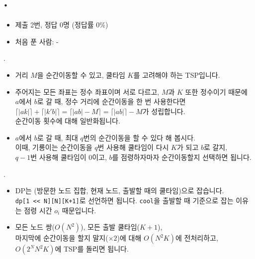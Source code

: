 
\section{\texorpdfstring{\pletter. \ptitle}{문제 \pletter}}

\begin{frame}[label=problem-L]
    \sectiontitle{\pletter}{\ptitle}
    \begin{itemize}
        \item 제출 2번, 정답 0명 (정답률 0\%)
        \item 처음 푼 사람: -
    \end{itemize}
\end{frame}

\begin{frame}{\textbf{\pletter}. \ptitle}

    \begin{itemize}
        \item 거리 $M$을 순간이동할 수 있고, 쿨타임 $K$를 고려해야 하는 TSP입니다.
        \item 주어지는 모든 좌표는 정수 좌표이며 서로 다르고, $M$과 $K$ 또한 정수이기 때문에 \\
        $a$에서 $b$로 갈 때, 정수 거리에 순간이동을 한 번 사용한다면 \\
        $\lceil |ak| \rceil + \lceil |k'b| \rceil = \lceil |ab| - M \rceil = \lceil |ab| \rceil - M$가 성립합니다. \\
        순간이동 횟수에 대해 일반화됩니다.

        \item $a$에서 $b$로 갈 때, 최대 $q$번의 순간이동을 할 수 있다 해 봅시다. \\
        이때, 기룡이는 순간이동을 $q$번 사용해 쿨타임이 다시 $K$가 되고 $b$로 갈지,\\ 
        $q-1$번 사용해 쿨타임이 $0$이고, $b$를 점령하자마자 순간이동할지 선택하면 됩니다. 
    \end{itemize}
\end{frame}
\begin{frame}{\textbf{\pletter}. \ptitle}

    \begin{itemize}
        \item DP는 (방문한 노드 집합, 현재 노드, 출발할 때의 쿨타임)으로 잡습니다.\\
        \texttt{dp[1 <{}< N][N][K+1]}로 선언하면 됩니다. \texttt{cool}을 출발할 때 기준으로 잡는 이유는 점령 시간 $o_i$ 때문입니다.

        \item 모든 노드 쌍($O(N^2)$), 모든 출발 쿨타임($K+1$), \\
        마지막에 순간이동을 할지 말지($\times 2$)에 대해 $O(N^2 K)$에 전처리하고, \\
        $O(2^N N^2 K)$에 TSP를 돌리면 됩니다.
    \end{itemize}
\end{frame}
